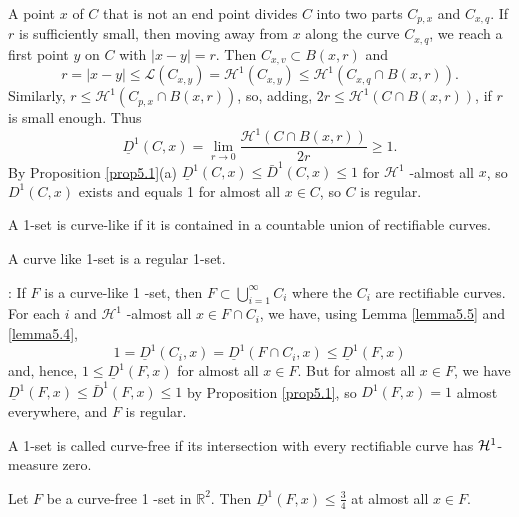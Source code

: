 A point $x$ of $C$ that is not an end point divides $C$ into two parts $C_{p, x}$ and $C_{x, q} .$ If $r$ is sufficiently small, then moving away from $x$ along the curve $C_{x, q}$, we reach a first point $y$ on $C$ with $|x-y|=r$. Then $C_{x, v} \subset B(x, r)$ and
$$
r=|x-y| \leq \mathcal{L}\left(C_{x, y}\right)=\mathcal{H}^{1}\left(C_{x, y}\right) \leq \mathcal{H}^{1}\left(C_{x, q} \cap B(x, r)\right) .
$$
Similarly, $r \leq \mathcal{H}^{1}\left(C_{p, x} \cap B(x, r)\right)$, so, adding, $2 r \leq \mathcal{H}^{1}(C \cap B(x, r))$, if $r$ is
small enough. Thus
$$
\underline{D}^{1}(C, x)=\lim _{r \rightarrow 0} \frac{\mathcal{H}^{1}(C \cap B(x, r))}{2 r} \geq 1 .
$$
By Proposition \ref{prop5.1}(a) $\underline{D}^{1}(C, x) \leq \bar{D}^{1}(C, x) \leq 1$ for $\mathcal{H}^{1}$ -almost all $x$, so
$D^{1}(C, x)$ exists and equals 1 for almost all $x \in C$, so $C$ is regular.


\begin{definition}
    A 1-set is curve-like if it is contained in a countable union of rectifiable curves.
\end{definition}

\begin{proposition}\label{prop5.6}
    A curve like 1-set is a regular 1-set. 
\end{proposition}
\proof: If $F$ is a curve-like 1 -set, then $F \subset \bigcup_{i=1}^{\infty} C_{i}$ where the $C_{i}$ are rectifiable curves. For each $i$ and $\mathcal{H}^{1}$ -almost all $x \in F \cap C_{i}$, we have, using Lemma \ref{lemma5.5} and \ref{lemma5.4},
$$
1=\underline{D}^{1}\left(C_{i}, x\right)=\underline{D}^{1}\left(F \cap C_{i}, x\right) \leq \underline{D}^{1}(F, x)
$$
and, hence, $1 \leq \underline{D}^{1}(F, x)$ for almost all $x \in F$. But for almost all $x \in F$, we have $\underline{D}^{1}(F, x) \leq \bar{D}^{1}(F, x) \leq 1$ by Proposition \ref{prop5.1}, so
$D^{1}(F, x)=1$ almost everywhere, and $F$ is regular.

\begin{definition}
    A 1-set is called curve-free if its intersection with every rectifiable curve has $\mathcal{H}^1$-measure zero. 
\end{definition}


\begin{proposition}Let $F$ be a curve-free 1 -set in $\mathbb{R}^{2}$. Then $\underline{D}^{1}(F, x) \leq \frac{3}{4}$ at almost all $x \in F .$
\end{proposition}

